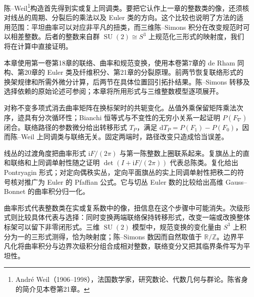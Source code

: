 \ProseParagraphBreak

陈--Weil\footnote{André Weil（1906--1998），法国数学家，研究数论、代数几何与群论。陈省身的简介见本卷第21章。}构造首先得到实或复上同调类。要把它认作上一章的整数类的像，还须核对线丛的周期、分裂后的乘法以及 Euler 类的方向。这个比较也说明了方法的适用范围：平坦曲率可以对应非平凡的扭类，而三维陈--Simons 积分在改变规范时可以相差整数。后者的整数来自群 \(\operatorname{SU}(2)\cong S^3\) 上规范化三形式的映射度，我们将在计算中直接证明。

\ProseParagraphBreak

本章使用第一卷第18章的联络、曲率和规范变换，使用本卷第7章的 de Rham 同构、第20章的 Euler 类及纤维积分、第21章的分裂原理。前两节恢复联络形式的换架规律和所需外微分计算，后两节在具体位置回引拓扑结果。陈--Simons 转移及选择依赖的原始论述可参阅\cite[第3节]{ChernSimons1974}；本章将所用形式与三维整数模型逐项展开。






\begin{chaptersummary}
	对称不变多项式消去曲率矩阵在换标架时的共轭变化。丛值外乘保留矩阵乘法次序，迹具有分次循环性；Bianchi 恒等式与不变性的无穷小关系一起证明 \(P(F_\nabla)\) 闭合。联络路径的参数微分给出转移形式 \(T_P\)，满足 \(\mathrm dT_P=P(F_1)-P(F_0)\)，因而陈--Weil 上同调类与联络无关。固定两端时，路径改变只造成恰当误差。

	\ProseParagraphBreak

	线丛的过渡角度把曲率形式 \(\mathrm iF/(2\pi)\) 与第一陈整数上圈联系起来。复旗丛上的直和联络和上同调单射性随之证明 \(\det(I+\mathrm iF/(2\pi))\) 代表总陈类。复化给出 Pontryagin 形式；对定向偶秩实丛，定向平面旗丛的实上同调单射性把秩二的符号核对推广为 Euler 的 Pfaffian 公式。它与切丛 Euler 数的比较给出高维 Gauss--Bonnet 的曲率积分归一化。

	\ProseParagraphBreak

	曲率形式代表整数类在实或复系数中的像，扭信息在这个步骤中可能消失。次级形式则比较具体代表与选择：同时变换两端联络保持转移形式，改变一端或改换整体标架可以留下非零闭形式。三维 \(\operatorname{SU}(2)\) 模型中，规范变换的变化量由 \(S^3\) 上积分为一的三形式测得，恰为映射度；陈--Simons 数因而自然取值于 \(\mathbb R/\mathbb Z\)。边界平凡化将曲率积分与边界次级积分组合成相对整数，联络变分又把其临界条件写为平坦性。
\end{chaptersummary}

